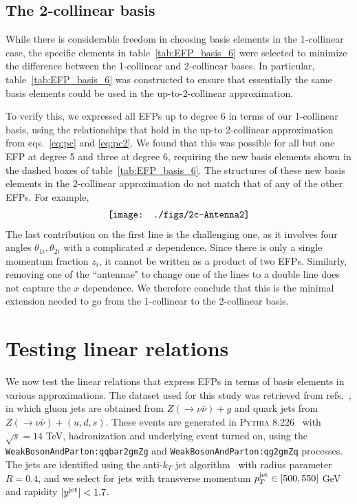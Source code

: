 \documentclass[a4paper,11pt]{article}
\newcommand{\eqs}[2]{eqs.~\eqref{eq:#1} and \eqref{eq:#2}}
\newcommand{\tab}[1]{table~\ref{tab:#1}}
\newcommand{\refscite}[1]{refs.~\cite{#1}}
\newcommand{\Pythia}{\textsc{Pythia}\xspace}
\begin{document}
     
\subsection{The 2-collinear basis}
\label{sec:2c_basis_present}

While there is considerable freedom in choosing basis elements in the 1-collinear case, the specific elements in \tab{EFP_basis_6} were selected to minimize the difference between the 1-collinear and 2-collinear bases.
%
In particular, \tab{EFP_basis_6} was constructed to ensure that essentially the same basis elements could be used in the up-to-2-collinear approximation.


To verify this, we expressed all EFPs up to degree 6 in terms of our 1-collinear basis, using the relationships that hold in the up-to 2-collinear approximation from \eqs{pc}{pc2}.
%
We found that this was possible for all but one EFP at degree 5 and three at degree 6, requiring the new basis elements shown in the dashed boxes of \tab{EFP_basis_6}.
%
The structures of these new basis elements in the 2-collinear approximation do not match that of any of the other EFPs.
%
For example,  
\begin{align}
 \texttt{[image: ./figs/2c-Antenna2]} \raisetag{1.5\baselineskip}    
\end{align}
The last contribution on the first line is the challenging one, as it involves  four angles $\theta_{1i}, \theta_{2i}$ with a complicated $x$ dependence.
%
Since there is only a single momentum fraction $z_i$, it cannot be written as a product of two EFPs.
%
Similarly, removing one of the ``antennae" to change one of the lines to a double line does not capture the $x$ dependence.
%
We therefore conclude that this is the minimal extension needed to go from the 1-collinear to the 2-collinear basis.



\section{Testing linear relations}
\label{sec:results}

We now test the linear relations that express EFPs in terms of basis elements in various approximations.
%
The dataset used for this study was retrieved from \refscite{Zenodo:EnergyFlow:Pythia8QGs, Komiske:2018cqr}, in which gluon jets are obtained from $Z (\to \nu \bar{\nu})+g$ and quark jets from $ Z(\to \nu \bar{\nu}) + (u, d, s) $.
%
These events are generated in \Pythia 8.226~\cite{Sjostrand:2014zea} with $\sqrt{s} = 14$ TeV, hadronization and underlying event turned on, using the \texttt{WeakBosonAndParton:qqbar2gmZg} and \texttt{WeakBosonAndParton:qg2gmZq} processes.
%
The jets are identified using the anti-$k_T$ jet algorithm~\cite{Cacciari:2008gp,Cacciari:2011ma} with radius parameter $R=0.4$, and we select for jets with transverse momentum $p_T^{{\rm jet}} \in [500,550]$ GeV and rapidity $|y^{\rm jet}| < 1.7$.
\end{document}
